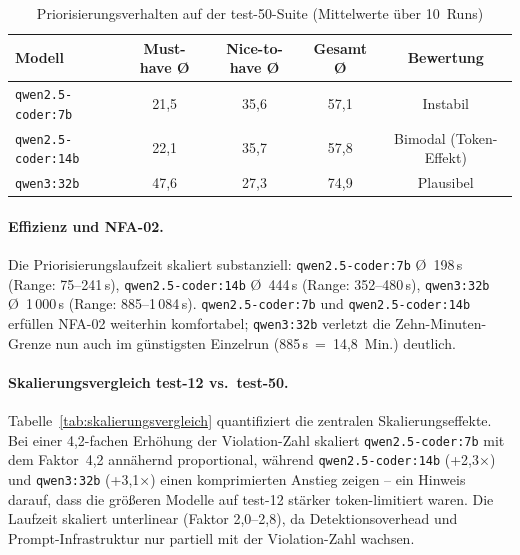 \begin{table}[htbp]
\centering
\small
\renewcommand{\arraystretch}{1.15}
\begin{tabular}{@{}lcccc@{}}
\toprule
\textbf{Modell} & \textbf{Must-have Ø} & \textbf{Nice-to-have Ø} & \textbf{Gesamt Ø} & \textbf{Bewertung} \\
\midrule
\texttt{qwen2.5-coder:7b}  & 21{,}5 & 35{,}6 & 57{,}1 & Instabil \\
\texttt{qwen2.5-coder:14b} & 22{,}1 & 35{,}7 & 57{,}8 & Bimodal (Token-Effekt) \\
\texttt{qwen3:32b}         & 47{,}6 & 27{,}3 & 74{,}9 & Plausibel \\
\bottomrule
\end{tabular}
\caption{Priorisierungsverhalten auf der test-50-Suite (Mittelwerte über 10~Runs)}
\label{tab:priorisierungsqualitaet_50}
\end{table}

\paragraph{Effizienz und NFA-02.}
Die Priorisierungslaufzeit skaliert substanziell: \texttt{qwen2.5-coder:7b} \O{}~198\,s (Range: 75--241\,s), \texttt{qwen2.5-coder:14b} \O{}~444\,s (Range: 352--480\,s), \texttt{qwen3:32b} \O{}~1\,000\,s (Range: 885--1\,084\,s). \texttt{qwen2.5-coder:7b} und \texttt{qwen2.5-coder:14b} erfüllen \ac{NFA}-02 weiterhin komfortabel; \texttt{qwen3:32b} verletzt die Zehn-Minuten-Grenze nun auch im günstigsten Einzelrun (885\,s~=~14,8~Min.) deutlich.

\paragraph{Skalierungsvergleich test-12 vs.\ test-50.}
Tabelle~\ref{tab:skalierungsvergleich} quantifiziert die zentralen Skalierungseffekte. Bei einer 4,2-fachen Erhöhung der Violation-Zahl skaliert \texttt{qwen2.5-coder:7b} mit dem Faktor~4,2 annähernd proportional, während \texttt{qwen2.5-coder:14b} (+2,3×) und \texttt{qwen3:32b} (+3,1×) einen komprimierten Anstieg zeigen -- ein Hinweis darauf, dass die größeren Modelle auf test-12 stärker token-limitiert waren. Die Laufzeit skaliert unterlinear (Faktor 2,0--2,8), da Detektionsoverhead und Prompt-Infrastruktur nur partiell mit der Violation-Zahl wachsen.

